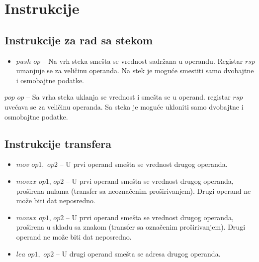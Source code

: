 \documentclass[a4paper, 10pt]{article}
\begin{document}
\section{Instrukcije}
	\subsection{Instrukcije za rad sa stekom}
		\begin{itemize}
			\item $push$ $op$ -- Na vrh steka smešta se vrednost sadržana u operandu. Registar $rsp$ umanjuje se za veličinu operanda. Na stek je moguće smestiti samo dvobajtne i osmobajtne podatke.
		\end{itemize} $pop$ $op$ -- Sa vrha steka uklanja se vrednost i smešta se u operand. registar $rsp$ uvećava se za veličinu operanda. Sa steka je moguće ukloniti samo dvobajtne i osmobajtne podatke. 
	\subsection{Instrukcije transfera}
		\begin{itemize}
			\item $mov$ $op1,$ $op2$ -- U prvi operand smešta se vrednost drugog operanda.
			\item $movzx$ $op1$, $op2$ -- U prvi operand smešta se vrednost drugog operanda, proširena nulama (transfer sa neoznačenim proširivanjem). Drugi operand ne može biti dat neposredno.
			\item $movsx$ $op1$, $op2$ -- U prvi operand smešta se vrednost drugog operanda, proširena u skladu sa znakom (transfer sa označenim proširivanjem).  Drugi operand ne može biti dat neposredno.
			\item $lea$ $op1,$ $op2$ -- U drugi operand smešta se adresa drugog operanda.
		\end{itemize}
\end{document}

